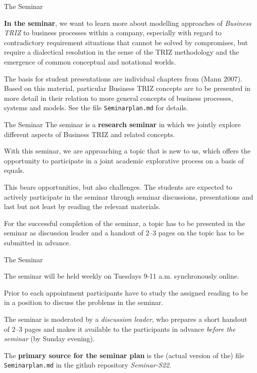 \documentclass{beamer}
\begin{document}
\begin{frame}{The Seminar}

\textbf{In the seminar}, we want to learn more about modelling approaches of
\emph{Business TRIZ} to business processes within a company, especially with
regard to contradictory requirement situations that cannot be solved by
compromises, but require a dialectical resolution in the sense of the TRIZ
methodology and the emergence of common conceptual and notational worlds.

The basis for student presentations are individual chapters from (Mann 2007).
Based on this material, particular Business TRIZ concepts are to be presented
in more detail in their relation to more general concepts of business
processes, systems and models.  See the file \texttt{Seminarplan.md} for
details.

\end{frame}

\begin{frame}{The Seminar}
The seminar is a \textbf{research seminar} in which we jointly explore
different aspects of Business TRIZ and related concepts.

With this seminar, we are approaching a topic that is new to us, which offers
the opportunity to participate in a joint academic explorative process on a
basis of equals.

This bears opportunities, but also challenges.  The students are expected to
actively participate in the seminar through seminar discussions, presentations
and last but not least by reading the relevant materials.

For the successful completion of the seminar, a topic has to be presented in
the seminar as discussion leader and a handout of 2--3 pages on the topic has
to be submitted in advance.
\end{frame}

\begin{frame}{The Seminar}

The seminar will be held weekly on Tuesdays 9-11 a.m. synchronously online.

Prior to each appointment participants have to study the assigned reading to
be in a position to discuss the problems in the seminar.

The seminar is moderated by a \emph{discussion leader}, who prepares a short
handout of 2--3 pages and makes it available to the participants in advance
\emph{before the seminar} (by Sunday evening).

The \textbf{primary source for the seminar plan} is the (actual version of
the) file \texttt{Seminarplan.md} in the github repository \emph{Seminar-S22}.
\end{frame}
\end{document}
